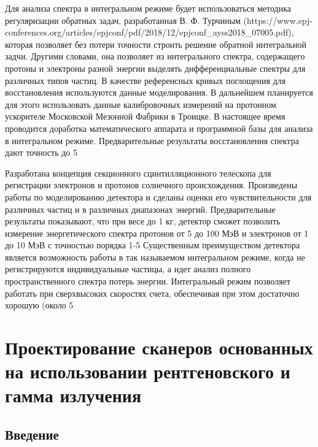 Для анализа спектра в интегральном режиме будет использоваться методика регуляризации обратных задач, разработанная В. Ф. Турчиным (https://www.epj-conferences.org/articles/epjconf/pdf/2018/12/epjconf_ayss2018_07005.pdf), которая позволяет без потери точности строить решение обратной интегральной задчи. Другими словами, она позволяет из интегрального спектра, содержащего протоны и электроны разной энергии выделять дифференциальные спектры для различных типов частиц. В качестве референсных кривых поглощения для восстановления используются данные моделирования. В дальнейшем планируется для этого использовать данные калибровочных измерений на протонном ускорителе Московской Мезонной Фабрики в Троицке.
В настоящее время проводится доработка математического аппарата и программной базы для анализа в интегральном режиме. Предварительные результаты восстановления спектра дают точность до 5%

Разработана концепция секционного сцинтилляционного телескопа для регистрации электронов и протонов солнечного происхождения. Произведены работы по моделированию детектора и сделаны оценки его чувствительности для различных частиц и в различных диапазонах энергий. Предварительные результаты показывают, что при весе до 1 кг, детектор сможет позволить измерение энергетического спектра протонов от 5 до 100 МэВ и электронов от 1 до 10 МэВ с точностью порядка 1-5%
Существенным преимуществом детектора является возможность работы в так называемом интегральном режиме, когда не регистрируются индивидуальные частицы, а идет анализ полного пространственного спектра потерь энергии. Интегральный режим позволяет работать при сверхвысоких скоростях счета, обеспечивая при этом достаточно хорошую (около 5%



\section{Проектирование сканеров основанных на использовании рентгеновского и гамма излучения
}\label{sec:detectors/scanners}


\subsection{Введение}


